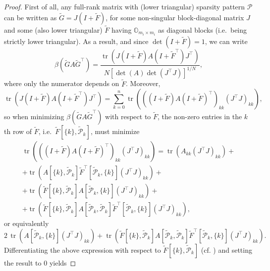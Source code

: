 \documentclass[a4paper]{article}
\DeclareMathOperator{\trace}{tr}
\theoremstyle{plain}
\theoremstyle{definition}
\theoremstyle{remark}
\begin{document}
\begin{proof}
	First of all, any full-rank matrix with (lower triangular) sparsity pattern \(\mathcal{P}\) can be written as \(\tilde{G} = J(I + \tilde{F})\), for some non-singular block-diagonal matrix \(J\) and some (also lower triangular) \(\tilde{F}\) having \(\mathbb{O}_{m_i \times m_i}\) as diagonal blocks (i.e.\ being strictly lower triangular). As a result, and since \(\det(I + \tilde{F}) = 1\), we can write
	\begin{equation*}
		\beta(\tilde{G} A \tilde{G}^{\top}) = \frac{\trace\left( J (I + \tilde{F}) A (I + \tilde{F}^{\top}) J^{\top} \right)}{N \left[ \det(A)\det(J^{\top} J) \right]^{1/N}},
	\end{equation*}
	where only the numerator depends on \(\tilde{F}\). Moreover,
	\begin{equation*}
		\trace\left( J (I + \tilde{F}) A (I + \tilde{F}^{\top}) J^{\top} \right) = \sum_{k=0}^n \trace\left( ((I + \tilde{F}) A (I + \tilde{F})^{\top})_{kk}  (J^{\top}J)_{kk}\right),
	\end{equation*}
	so when minimizing \(\beta(\tilde{G} A \tilde{G}^{\top})\) with respect to \(\tilde{F}\), the non-zero entries in the \(k\)th row of \(\tilde{F}\), i.e.\ \(\tilde{F}[\{k\}, \tilde{\mathcal{P}}_k]\), must minimize
	\begin{multline*}
		\trace\left( ((I + \tilde{F}) A (I + \tilde{F})^{\top})_{kk}  (J^{\top}J)_{kk}\right) = \trace\left( A_{kk} (J^{\top}J)_{kk} \right) +\\
		+ \trace\left( A[\{k\}, \tilde{\mathcal{P}}_k] \tilde{F}^{\top}[\tilde{\mathcal{P}}_k, \{k\}] (J^{\top}J)_{kk} \right) +\\
		+ \trace\left( \tilde{F}[\{k\}, \tilde{\mathcal{P}}_k] A[\tilde{\mathcal{P}}_k, \{k\}] (J^{\top}J)_{kk} \right) +\\
        + \trace\left( \tilde{F}[\{k\}, \tilde{\mathcal{P}}_k] A[\tilde{\mathcal{P}}_k, \tilde{\mathcal{P}}_k] \tilde{F}^{\top}[\tilde{\mathcal{P}}_k, \{k\}] (J^{\top}J)_{kk} \right),
	\end{multline*}
	or equivalently
	\begin{equation*}
		2 \, \trace\left( A[\tilde{\mathcal{P}}_k, \{k\}] (J^{\top}J)_{kk} \right) + \trace\left( \tilde{F}[\{k\}, \tilde{\mathcal{P}}_k] A[\tilde{\mathcal{P}}_k, \tilde{\mathcal{P}}_k] \tilde{F}^{\top}[\tilde{\mathcal{P}}_k, \{k\}] (J^{\top}J)_{kk} \right).
	\end{equation*}
	Differentiating the above expression with respect to \(\tilde{F}[\{k\}, \tilde{\mathcal{P}}_k]\) (cf. \cite[Section~2.5]{Petersen2012}) and setting the result to 0 yields

\end{proof}
\end{document}
